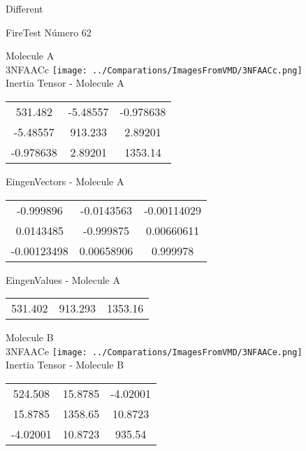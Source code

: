 \begin{center}
\vtab
\vtab
\textcolor{NavyBlue}{\Large Different}
\end{center}

 \newpage

\vtab[-2cm]
\begin{center}
{\large FireTest \tab Número 62}
\end{center}
\begin{multicols}{2}
\begin{center}

Molecule A \\ 
3NFAACc
\texttt{[image: ../Comparations/ImagesFromVMD/3NFAACc.png]}
\\
Inertia Tensor - Molecule A \\
\vtab

\begin{tabular}{|c c c|}
531.482	 & 	-5.48557	 & 	-0.978638	 \\
-5.48557	 & 	913.233	 & 	2.89201	 \\
-0.978638	 & 	2.89201	 & 	1353.14
\end{tabular}

\vtab
 EingenVectors - Molecule A     \\
\vtab
\begin{tabular}{|c c c|}
-0.999896	 & 	-0.0143563	 & 	-0.00114029	 \\
0.0143485	 & 	-0.999875	 & 	0.00660611	 \\
-0.00123498	 & 	0.00658906	 & 	0.999978
\end{tabular}

\vtab
 EingenValues - Molecule A     \\
\vtab
\begin{tabular}{|c c c|}
531.402	 & 	913.293	 & 	1353.16	 \\
\end{tabular}
\columnbreak

Molecule B \\ 
3NFAACe
\texttt{[image: ../Comparations/ImagesFromVMD/3NFAACe.png]}
\\
Inertia Tensor - Molecule B \\
\vtab

\begin{tabular}{|c c c|}
524.508	 & 	15.8785	 & 	-4.02001	 \\
15.8785	 & 	1358.65	 & 	10.8723	 \\
-4.02001	 & 	10.8723	 & 	935.54
\end{tabular}


\end{center}
\end{multicols}
